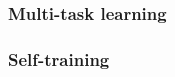 



\parencite{van2019strategies}

\subsubsection{Multi-task learning}
\label{sssec:backdp:mtl}

\subsubsection{Self-training}
\label{sssec:backdp:st}
